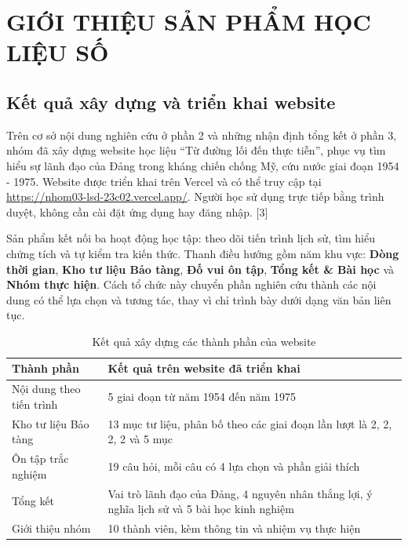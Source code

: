 \chapter{GIỚI THIỆU SẢN PHẨM HỌC LIỆU SỐ}

\section{Kết quả xây dựng và triển khai website}

Trên cơ sở nội dung nghiên cứu ở phần 2 và những nhận định tổng kết ở phần 3, nhóm đã xây dựng website học liệu “Từ đường lối đến thực tiễn”, phục vụ tìm hiểu sự lãnh đạo của Đảng trong kháng chiến chống Mỹ, cứu nước giai đoạn 1954 - 1975. Website được triển khai trên Vercel và có thể truy cập tại \url{https://nhom03-lsd-23c02.vercel.app/}. Người học sử dụng trực tiếp bằng trình duyệt, không cần cài đặt ứng dụng hay đăng nhập. [3]

Sản phẩm kết nối ba hoạt động học tập: theo dõi tiến trình lịch sử, tìm hiểu chứng tích và tự kiểm tra kiến thức. Thanh điều hướng gồm năm khu vực: \textbf{Dòng thời gian}, \textbf{Kho tư liệu Bảo tàng}, \textbf{Đố vui ôn tập}, \textbf{Tổng kết \& Bài học} và \textbf{Nhóm thực hiện}. Cách tổ chức này chuyển phần nghiên cứu thành các nội dung có thể lựa chọn và tương tác, thay vì chỉ trình bày dưới dạng văn bản liên tục.

\begin{table}[H]
\centering
\begingroup\small{}\renewcommand{\arraystretch}{1.25}\setlength{\extrarowheight}{2pt}
\begin{tabularx}{\textwidth}{|>{\raggedright\arraybackslash}p{}|L|}
\hline
\textbf{Thành phần} & \textbf{Kết quả trên website đã triển khai} \\
\hline
Nội dung theo tiến trình & 5 giai đoạn từ năm 1954 đến năm 1975 \\
\hline
Kho tư liệu Bảo tàng & 13 mục tư liệu, phân bố theo các giai đoạn lần lượt là 2, 2, 2, 2 và 5 mục \\
\hline
Ôn tập trắc nghiệm & 19 câu hỏi, mỗi câu có 4 lựa chọn và phần giải thích \\
\hline
Tổng kết & Vai trò lãnh đạo của Đảng, 4 nguyên nhân thắng lợi, ý nghĩa lịch sử và 5 bài học kinh nghiệm \\
\hline
Giới thiệu nhóm & 10 thành viên, kèm thông tin và nhiệm vụ thực hiện \\
\hline
\end{tabularx}
\endgroup
\caption{Kết quả xây dựng các thành phần của website}
\label{tab:web-1}
\end{table}

